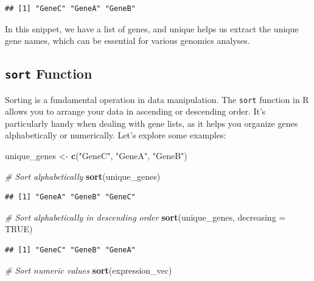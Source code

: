 \documentclass[
]{book}
\newenvironment{Shaded}{\begin{snugshade}}{\end{snugshade}}
\newcommand{\AttributeTok}[1]{\textcolor[rgb]{0.13,0.29,0.53}{#1}}
\newcommand{\CommentTok}[1]{\textcolor[rgb]{0.56,0.35,0.01}{\textit{#1}}}
\newcommand{\ConstantTok}[1]{\textcolor[rgb]{0.56,0.35,0.01}{#1}}
\newcommand{\FunctionTok}[1]{\textcolor[rgb]{0.13,0.29,0.53}{\textbf{#1}}}
\newcommand{\NormalTok}[1]{#1}
\newcommand{\OtherTok}[1]{\textcolor[rgb]{0.56,0.35,0.01}{#1}}
\newcommand{\StringTok}[1]{\textcolor[rgb]{0.31,0.60,0.02}{#1}}
\begin{document}
\begin{verbatim}
## [1] "GeneC" "GeneA" "GeneB"
\end{verbatim}

In this snippet, we have a list of genes, and unique helps us extract the unique gene names, which can be essential for various genomics analyses.

\hypertarget{sort-function}{%
\subsection{\texorpdfstring{\texttt{sort} Function}{sort Function}}\label{sort-function}}

Sorting is a fundamental operation in data manipulation. The \texttt{sort} function in R allows you to arrange your data in ascending or descending order. It's particularly handy when dealing with gene lists, as it helps you organize genes alphabetically or numerically. Let's explore some examples:

\begin{Shaded}
\begin{Highlighting}[]
\NormalTok{unique\_genes }\OtherTok{\textless{}{-}} \FunctionTok{c}\NormalTok{(}\StringTok{"GeneC"}\NormalTok{, }\StringTok{"GeneA"}\NormalTok{, }\StringTok{"GeneB"}\NormalTok{)}

\CommentTok{\# Sort alphabetically}
\FunctionTok{sort}\NormalTok{(unique\_genes)}
\end{Highlighting}
\end{Shaded}

\begin{verbatim}
## [1] "GeneA" "GeneB" "GeneC"
\end{verbatim}

\begin{Shaded}
\begin{Highlighting}[]
\CommentTok{\# Sort alphabetically in descending order}
\FunctionTok{sort}\NormalTok{(unique\_genes, }\AttributeTok{decreasing =} \ConstantTok{TRUE}\NormalTok{)}
\end{Highlighting}
\end{Shaded}

\begin{verbatim}
## [1] "GeneC" "GeneB" "GeneA"
\end{verbatim}

\begin{Shaded}
\begin{Highlighting}[]
\CommentTok{\# Sort numeric values}
\FunctionTok{sort}\NormalTok{(expression\_vec)}
\end{Highlighting}
\end{Shaded}
\end{document}
